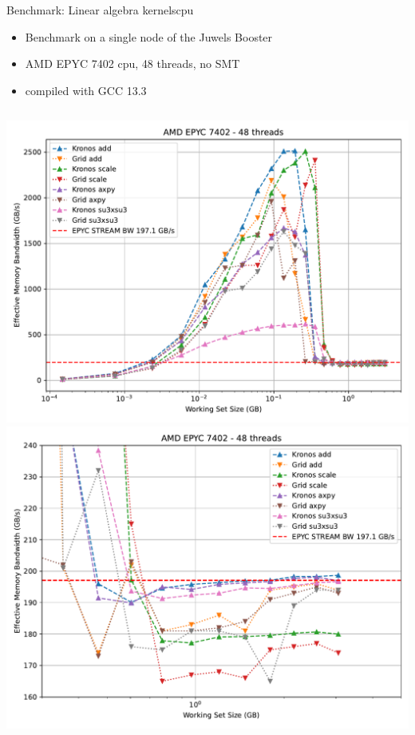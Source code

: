 \begin{frame}{Benchmark: Linear algebra kernels}{cpu}

  \begin{itemize}
    \item Benchmark on a single node of the Juwels Booster
    \item AMD EPYC 7402 cpu, 48 threads, no SMT
    \item compiled with GCC 13.3
  \end{itemize}

  \begin{columns}
      \includegraphics[width=\textwidth]{figs/comparison_grid_epyc.pdf}
      \includegraphics[width=\textwidth]{figs/comparison_grid_epyc_zoomed.pdf}
  \end{columns}
\end{frame}

